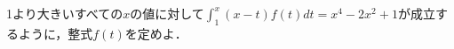\documentclass[../../main.tex]{subfiles}
\begin{document}
1より大きいすべての$x$の値に対して$\displaystyle\int_1^x(x-t)f(t)dt=x^4-2x^2+1$が成立するように，整式$f(t)$を定めよ．
\end{document}
